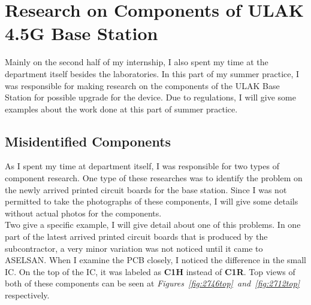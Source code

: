 \section{Research on Components of ULAK 4.5G Base Station  }
\- \indent
	Mainly on the second half of my internship, I also spent my time at the department itself besides the laboratories. In this part of my summer practice, I was responsible for making research on the components of the ULAK Base Station for possible upgrade for the device. Due to regulations, I will give some examples about the work done at this part of summer practice. 


\subsection{Misidentified Components}
\- \indent
	As I spent my time at department itself, I was responsible for two types of component research. One type of these researches was to identify the problem on the newly arrived printed circuit boards for the base station. Since I was not permitted to take the photographs of these components, I will give some details without actual photos for the components. \\	
	
	Two give a specific example, I will give detail about one of this problems. In one part of the latest arrived printed circuit boards that is produced by the subcontractor, a very minor variation was not noticed until it came to ASELSAN. When I examine the PCB closely, I noticed the difference in the small IC. On the top of the IC, it was labeled as \textbf{C1H} instead of \textbf{C1R}. Top views of both of these components can be seen at \textit{Figures~\ref{fig:2746top}~and~\ref{fig:2712top}} respectively.  
\\[1cm]
	 
	


